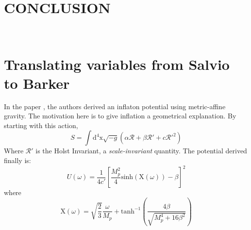 \documentclass[aps,prd,reprint,preprintnumbers,showpacs,floatfix,nofootinbib,superscript address]{revtex4-2}
\begin{document}

\newpage
$\,$

\newpage

\section{CONCLUSION}

\newpage
\,\,
\newpage

\appendix

\section{Translating variables from Salvio to Barker} \label{Appendix A}

In the paper \cite{Salvio_2022}, the authors derived an inflaton potential using metric-affine gravity. The motivation here is to give inflation a geometrical explanation. 
By starting with this action, 
\begin{equation}
    S = \int \text{d}^4\text{x} \sqrt{-g} (\alpha \mathcal{R} + \beta \mathcal{R}' + c \mathcal{R}'^{2})
\end{equation}
Where $\mathcal{R}'$ is the Holst Invariant, a \textit{scale-invariant} quantity. The potential derived finally is: 
\begin{equation}
    U(\omega) = \frac{1}{4 c'} \left[ \frac{M_{p}^{2}}{4} \text{sinh}(\text{X}(\omega)) - \beta  \right]^2
\end{equation}
where
\begin{equation}
    \text{X}(\omega) = \sqrt{\frac{2}{3}} \frac{\omega}{M_{p}} + \text{tanh}^{-1} \left(\frac{4 \beta}{\sqrt{M_{p}^{4}+16 \beta^2}} \right)
\end{equation}
\end{document}
